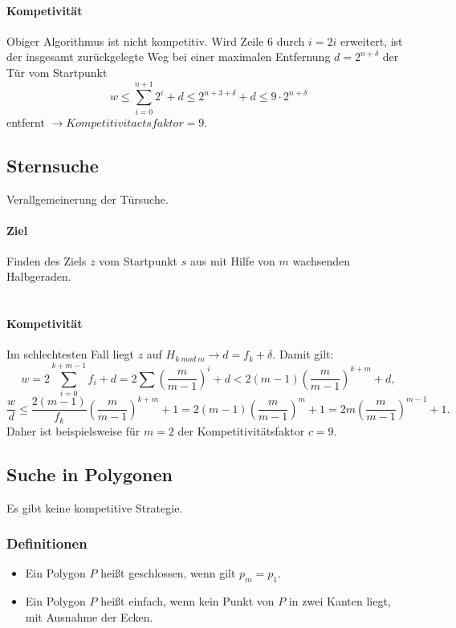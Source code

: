 \paragraph{Kompetivität}
Obiger Algorithmus ist nicht kompetitiv. Wird Zeile 6 durch \(i = 2i\) erweitert, ist der insgesamt zurückgelegte Weg bei einer maximalen Entfernung \(d=2^{n+\delta}\) der Tür vom Startpunkt
\[w \leq \sum_{i=0}^{n+1} 2^i+d \leq 2^{n+3+\delta}+d \leq 9 \cdot 2^{n+\delta}\]
entfernt \(\rightarrow Kompetitivitaetsfaktor=9\).


\subsection{Sternsuche}
Verallgemeinerung der Türsuche.

\paragraph{Ziel} Finden des Ziels \(z\) vom Startpunkt \(s\) aus mit Hilfe von \(m\) wachsenden Halbgeraden.
\text{}\\\\


\paragraph{Kompetivität}
Im schlechtesten Fall liegt \(z\) auf \(H_{k~mod~m}\rightarrow d = f_k+\delta\). Damit gilt:
\[w = 2\sum_{i=0}^{k+m-1} f_i + d = 2 \sum\left(\frac{m}{m-1}\right)^i+d < 2(m-1)\left(\frac{m}{m-1}\right)^{k+m}+d,\]
\[\frac{w}{d} \leq \frac{2(m-1)}{f_k}\left(\frac{m}{m-1}\right)^{k+m}+1=2(m-1)\left(\frac{m}{m-1}\right)^m+1=2m\left(\frac{m}{m-1}\right)^{m-1}+1.\]
Daher ist beispielsweise für \(m=2\) der Kompetitivitätsfaktor \(c=9\).


\subsection{Suche in Polygonen}
Es gibt keine kompetitive Strategie.

\subsubsection{Definitionen}
\begin{itemize}
	\item Ein Polygon \(P\) heißt geschlossen, wenn gilt \(p_m = p_1\).
	\item Ein Polygon \(P\) heißt einfach, wenn kein Punkt von \(P\) in zwei Kanten liegt, mit Ausnahme der Ecken.
\end{itemize}

